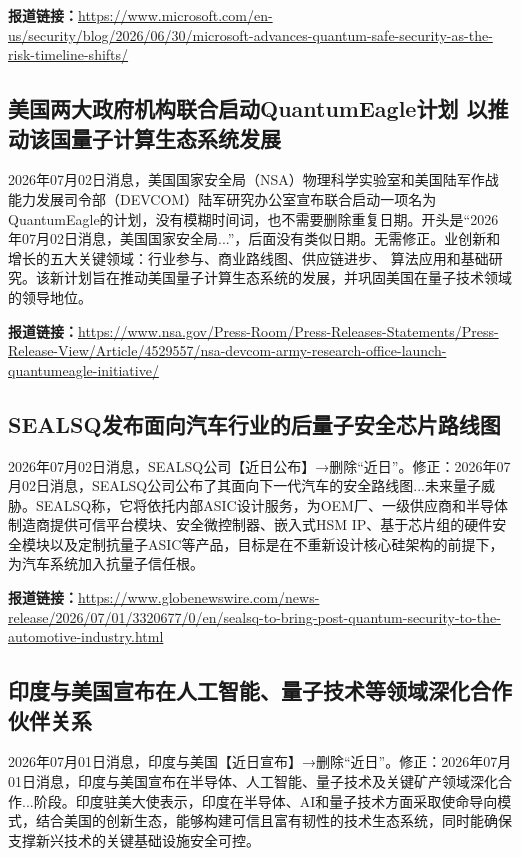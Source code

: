 \documentclass[12pt,a4paper]{ctexart}
\begin{document}
\noindent\textbf{报道链接：}\url{https://www.microsoft.com/en-us/security/blog/2026/06/30/microsoft-advances-quantum-safe-security-as-the-risk-timeline-shifts/}

\subsection{ 美国两大政府机构联合启动QuantumEagle计划 以推动该国量子计算生态系统发展 }

2026年07月02日消息，美国国家安全局（NSA）物理科学实验室和美国陆军作战能力发展司令部（DEVCOM）陆军研究办公室宣布联合启动一项名为QuantumEagle的计划，没有模糊时间词，也不需要删除重复日期。开头是“2026年07月02日消息，美国国家安全局...”，后面没有类似日期。无需修正。业创新和增长的五大关键领域：行业参与、商业路线图、供应链进步、 算法应用和基础研究。该新计划旨在推动美国量子计算生态系统的发展，并巩固美国在量子技术领域的领导地位。

\noindent\textbf{报道链接：}\url{https://www.nsa.gov/Press-Room/Press-Releases-Statements/Press-Release-View/Article/4529557/nsa-devcom-army-research-office-launch-quantumeagle-initiative/}

\subsection{ SEALSQ发布面向汽车行业的后量子安全芯片路线图 }

2026年07月02日消息，SEALSQ公司【近日公布】→删除“近日”。修正：2026年07月02日消息，SEALSQ公司公布了其面向下一代汽车的安全路线图...未来量子威胁。SEALSQ称，它将依托内部ASIC设计服务，为OEM厂、一级供应商和半导体制造商提供可信平台模块、安全微控制器、嵌入式HSM IP、基于芯片组的硬件安全模块以及定制抗量子ASIC等产品，目标是在不重新设计核心硅架构的前提下，为汽车系统加入抗量子信任根。

\noindent\textbf{报道链接：}\url{https://www.globenewswire.com/news-release/2026/07/01/3320677/0/en/sealsq-to-bring-post-quantum-security-to-the-automotive-industry.html}

\subsection{ 印度与美国宣布在人工智能、量子技术等领域深化合作伙伴关系 }

2026年07月01日消息，印度与美国【近日宣布】→删除“近日”。修正：2026年07月01日消息，印度与美国宣布在半导体、人工智能、量子技术及关键矿产领域深化合作...阶段。印度驻美大使表示，印度在半导体、AI和量子技术方面采取使命导向模式，结合美国的创新生态，能够构建可信且富有韧性的技术生态系统，同时能确保支撑新兴技术的关键基础设施安全可控。
\end{document}
